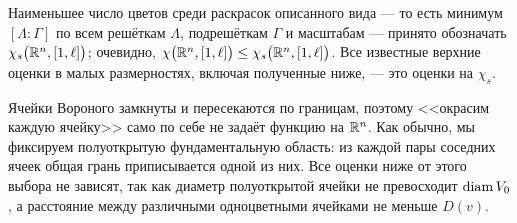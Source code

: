 Наименьшее число цветов среди раскрасок описанного вида --- то есть минимум
$[\Lambda:\Gamma]$ по всем решёткам $\Lambda$, подрешёткам $\Gamma$ и
масштабам --- принято обозначать $\chi_s\bigl(\mathbb{R}^n,[1,\ell]\bigr)$; очевидно,
$\chi\bigl(\mathbb{R}^n,[1,\ell]\bigr)\le\chi_s\bigl(\mathbb{R}^n,[1,\ell]\bigr)$. Все
известные верхние оценки в малых размерностях, включая полученные ниже, --- это
оценки на $\chi_s$.

\begin{remark}\label{rem:halfopen}
Ячейки Вороного замкнуты и пересекаются по границам, поэтому <<окрасим каждую
ячейку>> само по себе не задаёт функцию на $\mathbb{R}^n$. Как обычно, мы фиксируем
полуоткрытую фундаментальную область: из каждой пары соседних ячеек общая грань
приписывается одной из них. Все оценки ниже от этого выбора не зависят, так как
диаметр полуоткрытой ячейки не превосходит $\operatorname{diam} V_0$, а расстояние между
различными одноцветными ячейками не меньше $D(v)$.
\end{remark}


